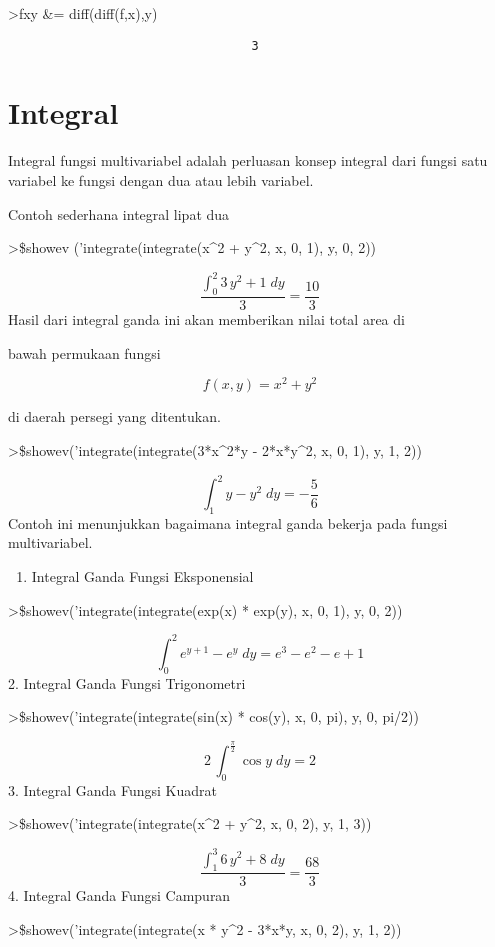 \documentclass[
]{book}
\providecommand{\tightlist}{%
  \setlength{\itemsep}{0pt}\setlength{\parskip}{0pt}}
\begin{document}
\textgreater fxy \&= diff(diff(f,x),y)

\begin{verbatim}
                                  3
\end{verbatim}

\section{Integral}\label{integral}

Integral fungsi multivariabel adalah perluasan konsep integral dari fungsi satu variabel ke fungsi dengan dua atau lebih variabel.

Contoh sederhana integral lipat dua

\textgreater\$showev ('integrate(integrate(x\^{}2 + y\^{}2, x, 0, 1), y, 0, 2))

\[\frac{\int_{0}^{2}{3\,y^2+1\;dy}}{3}=\frac{10}{3}\] Hasil dari integral ganda ini akan memberikan nilai total area di

bawah permukaan fungsi

\[f(x,y)=x^2+y^2\]

di daerah persegi yang ditentukan.

\textgreater\$showev('integrate(integrate(3*x\^{}2*y - 2*x*y\^{}2, x, 0, 1), y, 1, 2))

\[\int_{1}^{2}{y-y^2\;dy}=-\frac{5}{6}\]Contoh ini menunjukkan bagaimana integral ganda bekerja pada fungsi multivariabel.

\begin{enumerate}
\def\labelenumi{\arabic{enumi}.}
\tightlist
\item
  Integral Ganda Fungsi Eksponensial
\end{enumerate}

\textgreater\$showev('integrate(integrate(exp(x) * exp(y), x, 0, 1), y, 0, 2))

\[\int_{0}^{2}{e^{y+1}-e^{y}\;dy}=e^3-e^2-e+1\]2. Integral Ganda Fungsi Trigonometri

\textgreater\$showev('integrate(integrate(sin(x) * cos(y), x, 0, pi), y, 0, pi/2))

\[2\,\int_{0}^{\frac{\pi}{2}}{\cos y\;dy}=2\]3. Integral Ganda Fungsi Kuadrat

\textgreater\$showev('integrate(integrate(x\^{}2 + y\^{}2, x, 0, 2), y, 1, 3))

\[\frac{\int_{1}^{3}{6\,y^2+8\;dy}}{3}=\frac{68}{3}\]4. Integral Ganda Fungsi Campuran

\textgreater\$showev('integrate(integrate(x * y\^{}2 - 3*x*y, x, 0, 2), y, 1, 2))
\end{document}
